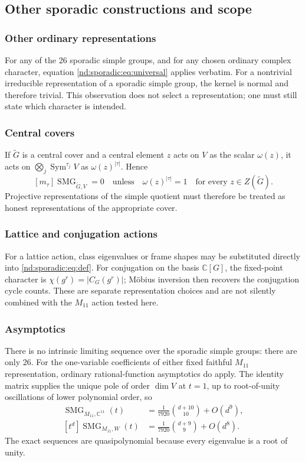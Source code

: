 \documentclass[10pt]{article}
\newcommand{\Sym}{\operatorname{Sym}}
\newcommand{\SMG}{\operatorname{SMG}}
\newcommand{\MGF}{\SMG}
\begin{document}
\subsection{Other sporadic constructions and scope}

\subsubsection{Other ordinary representations}
For any of the 26 sporadic simple groups, and for any chosen ordinary complex
character, equation \eqref{nd:sporadic:eq:universal} applies verbatim.  For a nontrivial
irreducible representation of a sporadic simple group, the kernel is normal
and therefore trivial.  This observation does not select a representation;
one must still state which character is intended.

\subsubsection{Central covers}
If $\widetilde G$ is a central cover and a central element $z$ acts on $V$ as
the scalar $\omega(z)$, it acts on
$\bigotimes_j\Sym^{\tau_j}V$ as $\omega(z)^{|\tau|}$.  Hence
\[
[m_\tau]\MGF_{\widetilde G,V}=0
\quad\text{unless}\quad \omega(z)^{|\tau|}=1
\quad\text{for every }z\in Z(\widetilde G).
\]
Projective representations of the simple quotient must therefore be treated
as honest representations of the appropriate cover.

\subsubsection{Lattice and conjugation actions}
For a lattice action, class eigenvalues or frame shapes may be substituted
directly into \eqref{nd:sporadic:eq:def}.  For conjugation on the basis $\mathbb C[G]$,
the fixed-point character is $\chi(g^r)=|C_G(g^r)|$; M\"obius inversion then
recovers the conjugation cycle counts.  These are separate representation
choices and are not silently combined with the $M_{11}$ action tested here.

\subsubsection{Asymptotics}
There is no intrinsic limiting sequence over the sporadic simple groups:
there are only 26.  For the one-variable coefficients of either fixed faithful
$M_{11}$ representation, ordinary rational-function asymptotics do apply.
The identity matrix supplies the unique pole of order $\dim V$ at $t=1$, up
to root-of-unity oscillations of lower polynomial order, so
\begin{align*}
[t^d]\MGF_{M_{11},\mathbb C^{11}}(t)
&=\frac1{7920}\binom{d+10}{10}+O(d^9),\\
[t^d]\MGF_{M_{11},W}(t)
&=\frac1{7920}\binom{d+9}{9}+O(d^8).
\end{align*}
The exact sequences are quasipolynomial because every eigenvalue is a root of
unity.
\end{document}
